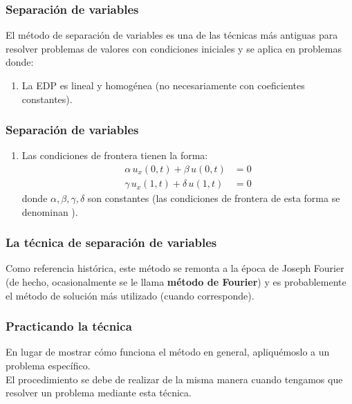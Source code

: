 \documentclass[12pt]{beamer}
\begin{document}
\begin{frame}
\frametitle{Separación de variables}
El método de separación de variables es una de las técnicas más antiguas para resolver problemas de valores con condiciones iniciales y se aplica en problemas donde:
\pause
{}
\begin{enumerate}[<+->]
\item La EDP es lineal y homogénea (no necesariamente con coeficientes constantes).
\seti
\end{enumerate}
\end{frame}
\begin{frame}
\frametitle{Separación de variables}
\begin{enumerate}[<+->]
\conti    
\item Las condiciones de frontera tienen la forma:
\begin{align*}
\alpha \, u_{x} (0, t) + \beta \, u (0, t) &= 0 \\
\gamma \, u_{x} (1, t) + \delta \, u (1, t) &= 0
\end{align*}
donde $\alpha, \beta, \gamma, \delta$ son constantes (las condiciones de frontera de esta forma se denominan ).
\end{enumerate}
\end{frame}
\begin{frame}
\frametitle{La técnica de separación de variables}
Como referencia histórica, este método se remonta a la época de Joseph Fourier (de hecho, ocasionalmente se le llama \textbf{método de Fourier}) y es probablemente el método de solución más utilizado (cuando corresponde).
\end{frame}
\begin{frame}
\frametitle{Practicando la técnica}
En lugar de mostrar cómo funciona el método en general, apliquémoslo a un problema específico.
\\
\bigskip
\pause
El procedimiento se debe de realizar de la misma manera cuando tengamos que resolver un problema mediante esta técnica.
\end{frame}
\end{document}
